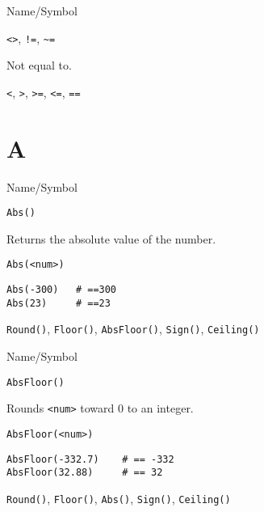\rl

\begin{desc}{Name/Symbol}
\item[Name/Symbol]  	\verb+<>+, \verb+!=+, \verb+~=+

\item[Description]  	Not equal to.

\item[Usage]		

\item[Example]	

\item[See Also]     	\verb+<+, \verb+>+, \verb+>=+, \verb+<=+, \verb+==+

\end{desc}

\rl 

\section{A} 
\rl

\begin{desc}{Name/Symbol}

\item[Name/Symbol] 	\verb+Abs()+

\item[Description]   	Returns the absolute value of the number.

\item[Usage]
\begin{verbatim}
Abs(<num>)
\end{verbatim}        

\item[Example]
\begin{verbatim}
Abs(-300)  	# ==300
Abs(23)    	# ==23
\end{verbatim}

\item[See Also]     	\verb+Round()+, \verb+Floor()+, \verb+AbsFloor()+, \verb+Sign()+, \verb+Ceiling()+
\end{desc}

\rl


\begin{desc}{Name/Symbol}

\item[Name/Symbol]  	\verb+AbsFloor()+

\item[Description]  	Rounds \verb+<num>+ toward 0 to an integer.

\item[Usage]       	
\begin{verbatim}
AbsFloor(<num>)
\end{verbatim}

\item[Example]
\begin{verbatim}
AbsFloor(-332.7)   	# == -332
AbsFloor(32.88)    	# == 32
\end{verbatim}

\item[See Also]     	\verb+Round()+, \verb+Floor()+, \verb+Abs()+, \verb+Sign()+, \verb+Ceiling()+
\end{desc}

